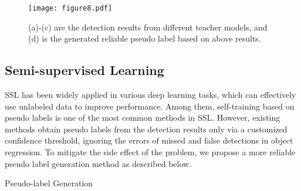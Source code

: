 \begin{figure*}[ht]
  \centering
  \texttt{[image: figure8.pdf]}
  \caption{(a)-(c) are the detection results from different teacher models, and (d) is the generated reliable pseudo label based on above results. }
  \label{fig8}
\end{figure*}

\subsection{Semi-supervised Learning}
\label{subsec:semisupervised}
SSL has been widely applied in various deep learning tasks, which can effectively use unlabeled data to improve performance. Among them, self-training based on pseudo labels is one of the most common methods in SSL. However, existing methods obtain pseudo labels from the detection results only via a customized confidence threshold, ignoring the errors of missed and false detections in object regression. To mitigate the side effect of the problem, we propose a more reliable pseudo label generation method as described below.


\begin{algorithm}
\caption{Pseudo-label Generation} 
\label{algorithm1}
    \KwIn{,
           ,
           }
    \KwOut{}
\end{algorithm}

